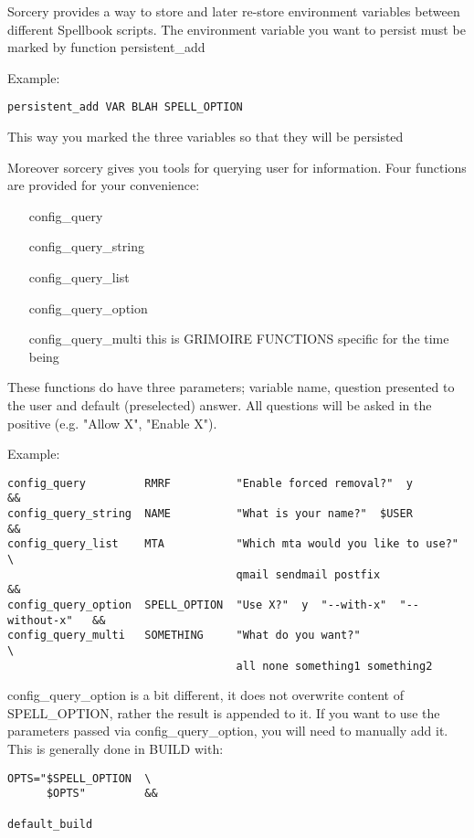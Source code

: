 \documentclass[a4paper,10pt]{book}
\begin{document}
Sorcery provides a way to store and later re-store environment variables
between different Spellbook scripts. The environment variable you want to
persist must be marked by function persistent\_add

Example:
\begin{verbatim}
persistent_add VAR BLAH SPELL_OPTION
\end{verbatim}

This way you marked the three variables so that they will be persisted

Moreover sorcery gives you tools for querying user for information. Four
functions are provided for your convenience:
\begin{itemize}
\item[config\_query]
\item[config\_query\_string]
\item[config\_query\_list]
\item[config\_query\_option]
\item[config\_query\_multi]
this is GRIMOIRE FUNCTIONS specific for the time being
\end{itemize}

These functions do have three parameters; variable name, question presented to
the user and default (preselected) answer. All questions will be asked in the
positive (e.g. "Allow X", "Enable X").

Example:
\begin{verbatim}
config_query         RMRF          "Enable forced removal?"  y              &&
config_query_string  NAME          "What is your name?"  $USER              &&
config_query_list    MTA           "Which mta would you like to use?"       \
                                   qmail sendmail postfix                   &&
config_query_option  SPELL_OPTION  "Use X?"  y  "--with-x"  "--without-x"   &&
config_query_multi   SOMETHING     "What do you want?"                      \
                                   all none something1 something2
\end{verbatim}

config\_query\_option is a bit different, it does not overwrite content of
\textdollar SPELL\_OPTION, rather the result is appended to it. If you want to
use the parameters passed via config\_query\_option, you will need to manually
add it. This is generally done in BUILD with:
\begin{verbatim}
OPTS="$SPELL_OPTION  \
      $OPTS"         &&

default_build
\end{verbatim}
\end{document}
